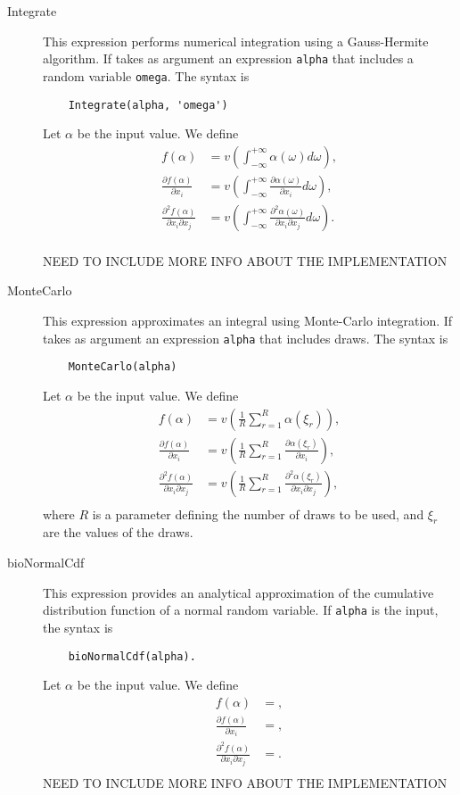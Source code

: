 \documentclass[12pt,a4paper]{article}
\begin{document}
\begin{description}
\item[Integrate] This expression performs numerical integration using
  a Gauss-Hermite algorithm. If takes as argument an expression
  \lstinline+alpha+ that includes a random variable
  \lstinline+omega+. The syntax is
  \begin{lstlisting}
    Integrate(alpha, 'omega')
  \end{lstlisting}
  Let $\alpha$ be the input value. We define
  \begin{align*}
    f(\alpha) &= v\left(\int_{-\infty}^{+\infty} \alpha(\omega) d\omega\right), \\
    \frac{\partial f(\alpha)}{\partial x_i} &= v\left(\int_{-\infty}^{+\infty} \frac{\partial \alpha(\omega)}{\partial x_i} d\omega\right),\\
    \frac{\partial^2 f(\alpha)}{\partial x_i\partial x_j} &= v\left( \int_{-\infty}^{+\infty} \frac{\partial^2 \alpha(\omega)}{\partial x_i \partial x_j} d\omega\right).\\
  \end{align*}

NEED TO INCLUDE MORE INFO ABOUT THE IMPLEMENTATION
  
\item[MonteCarlo] This expression approximates an integral using Monte-Carlo integration.
If takes as argument an expression
  \lstinline+alpha+ that includes draws.
The syntax is
  \begin{lstlisting}
    MonteCarlo(alpha)
  \end{lstlisting}
  Let $\alpha$ be the input value. We define
  \begin{align*}
    f(\alpha) &= v\left(\frac{1}{R}\sum_{r=1}^R \alpha(\xi_r)\right), \\
    \frac{\partial f(\alpha)}{\partial x_i} &= v\left(\frac{1}{R}\sum_{r=1}^R \frac{\partial \alpha(\xi_r)}{\partial x_i}\right), \\
    \frac{\partial^2 f(\alpha)}{\partial x_i\partial x_j} &= v\left(\frac{1}{R}\sum_{r=1}^R \frac{\partial^2 \alpha(\xi_r)}{\partial x_i \partial x_j}\right), \\
  \end{align*}
  where $R$ is a parameter defining the number of draws to be used, and $\xi_r$ are the values of the draws.
\item[bioNormalCdf] This expression provides an analytical approximation of the cumulative distribution function of a normal random variable. If \lstinline+alpha+ is the input, the syntax is
  \begin{lstlisting}
    bioNormalCdf(alpha).
  \end{lstlisting}
  Let $\alpha$ be the input value. We define
  \begin{align*}
    f(\alpha) &= , \\
    \frac{\partial f(\alpha)}{\partial x_i} &= ,\\
    \frac{\partial^2 f(\alpha)}{\partial x_i\partial x_j} &= .\\
  \end{align*}
NEED TO INCLUDE MORE INFO ABOUT THE IMPLEMENTATION


\end{description}
\end{document}
